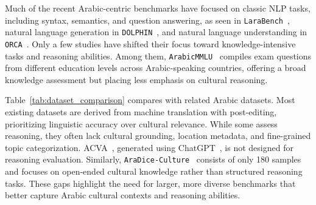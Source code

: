 Much of the recent Arabic-centric benchmarks have focused on classic NLP tasks, including syntax, semantics, and question answering, as seen in \texttt{LaraBench}~\citep{abdelali2024larabench}, natural language generation in \texttt{DOLPHIN}~\citep{elmadany2023dolphin}, and natural language understanding in \texttt{ORCA}~\citep{elmadany-etal-2023-orca}. Only a few studies have shifted their focus toward knowledge-intensive tasks and reasoning abilities. Among them, \texttt{ArabicMMLU}~\citep{koto-etal-2024-arabicmmlu} compiles exam questions from different education levels across Arabic-speaking countries, offering a broad knowledge assessment but placing less emphasis on cultural reasoning. 

Table~\ref{tab:dataset_comparison} compares \datasetname{} with related Arabic datasets. Most existing datasets are derived from machine translation with post-editing, prioritizing linguistic accuracy over cultural relevance. While some assess reasoning, they often lack cultural grounding, location metadata, and fine-grained topic categorization. ACVA~\citep{huang2023acegpt}, generated using ChatGPT~\citep{ouyang2022training}, is not designed for reasoning evaluation. Similarly, \texttt{AraDice-Culture}~\citep{mousi-etal-2025-aradice} consists of only 180 samples and focuses on open-ended cultural knowledge rather than structured reasoning tasks. These gaps highlight the need for larger, more diverse benchmarks that better capture Arabic cultural contexts and reasoning abilities.




